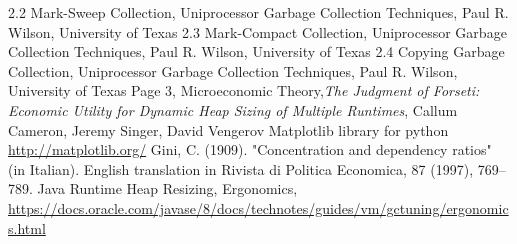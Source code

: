 \documentclass{l4proj}
\begin{document}
\begin{thebibliography}{9}
2.2 Mark-Sweep Collection, Uniprocessor Garbage Collection Techniques, Paul R. Wilson, University of Texas
2.3 Mark-Compact Collection, Uniprocessor Garbage Collection Techniques, Paul R. Wilson, University of Texas
2.4 Copying Garbage Collection, Uniprocessor Garbage Collection Techniques, Paul R. Wilson, University of Texas
Page 3, Microeconomic Theory,\emph{The Judgment of Forseti: Economic Utility for Dynamic Heap Sizing of Multiple Runtimes}, Callum Cameron, Jeremy Singer, David Vengerov
Matplotlib library for python
\url{http://matplotlib.org/}
Gini, C. (1909). "Concentration and dependency ratios" (in Italian). English translation in Rivista di Politica Economica, 87 (1997), 769–789.
Java Runtime Heap Resizing, Ergonomics,
\url{https://docs.oracle.com/javase/8/docs/technotes/guides/vm/gctuning/ergonomics.html}
\end{thebibliography}
\end{document}
